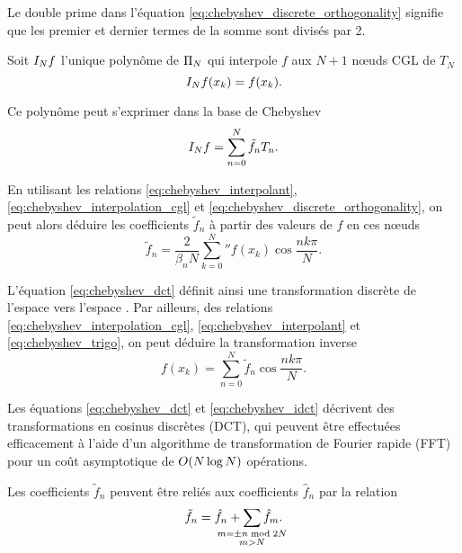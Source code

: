 Le double prime dans l'équation \eqref{eq:chebyshev_discrete_orthogonality} signifie que les premier et dernier termes de la somme sont divisés par 2.
\par


Soit $\interpolant{f}{N}$ l'unique polynôme de $\polyspace{N}$ qui interpole $f$ aux $N+1$ n\oe uds CGL de $T_N$
\begin{equation}
	\interpolant{f}{N}(x_k) = f(x_k).
	\label{eq:chebyshev_interpolation_cgl}
\end{equation}

Ce polynôme peut s'exprimer dans la base de Chebyshev
\begin{equation}
	\interpolant{f}{N} = \sum_{n=0}^{N} \tilde{f}_n T_n.
	\label{eq:chebyshev_interpolant}
\end{equation}

En utilisant les relations \eqref{eq:chebyshev_interpolant}, \eqref{eq:chebyshev_interpolation_cgl} et \eqref{eq:chebyshev_discrete_orthogonality}, on peut alors déduire les coefficients $\tilde{f}_n$ à partir des valeurs de $f$ en ces n\oe uds%
\begin{equation}
	\tilde{f}_n = \frac{2}{\beta_n N} \sum_{k=0}^{N} {''} f(x_k) \cos \frac{n k \pi}{N}.
	\label{eq:chebyshev_dct}
\end{equation}

L'équation \eqref{eq:chebyshev_dct} définit ainsi une transformation discrète de l'espace  vers l'espace . 
Par ailleurs, des relations \eqref{eq:chebyshev_interpolation_cgl}, \eqref{eq:chebyshev_interpolant} et \eqref{eq:chebyshev_trigo}, on peut déduire la transformation inverse
\begin{equation}
	f(x_k) = \sum_{n=0}^{N} \tilde{f}_n \cos \frac{n k \pi}{N}.
	\label{eq:chebyshev_idct}
\end{equation}

Les équations \eqref{eq:chebyshev_dct} et \eqref{eq:chebyshev_idct} décrivent des transformations en cosinus discrètes (DCT), qui peuvent être effectuées efficacement à l'aide d'un algorithme de transformation de Fourier rapide (FFT) pour un coût asymptotique de $\bigO{N \log N}$ opérations.
\par
Les coefficients $\tilde{f}_n$ peuvent être reliés aux coefficients $\hat{f}_n$ par la relation
\begin{equation}
	\tilde{f}_n = \hat{f}_n + 
	\sum_{\mathclap{\substack{m = \pm n \bmod{2N} \\ m > N}}} \hat{f}_m.
	\label{eq:chebyshev_aliasing}
\end{equation}

